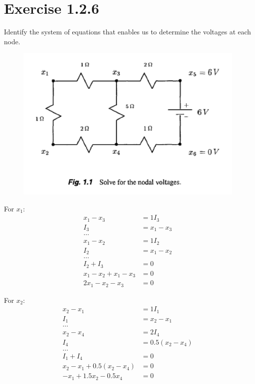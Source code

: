 \documentclass[10pt]{article}
\begin{document}
    \section{Exercise 1.2.6}
    Identify the system of equations that enables us to determine the voltages at each node.

    \begin{figure}[H]
        \centerline{\includegraphics[width=\textwidth]{fig_1_1_circuit}}
        \label{fig:circuit1}
    \end{figure}

    For \begin{math} x_1 \end{math}:
    \begin{align}
        x_1 - x_3 &= 1I_3 \\
        I_3 &= x_1 - x_3 \\
        \dots \\
        x_1 - x_2 &= 1I_2 \\
        I_2 &= x_1 - x_2 \\
        \dots \\
        I_2 + I_3 &= 0 \\
        x_1 - x_2 + x_1 - x_3 &= 0 \\
        2x_1 - x_2 - x_3 &= 0
    \end{align}

    For \begin{math} x_2 \end{math}:
    \begin{align}
        x_2 - x_1 &= 1I_1 \\
        I_1 &= x_2 - x_1 \\
        \dots \\
        x_2 - x_4 &= 2I_4 \\
        I_4 &= 0.5(x_2 - x_4) \\
        \dots \\
        I_1 + I_4 &= 0 \\
        x_2 - x_1 + 0.5(x_2 - x_4) &= 0 \\
        -x_1 + 1.5 x_2 - 0.5x_4 &= 0
    \end{align}
\end{document}
